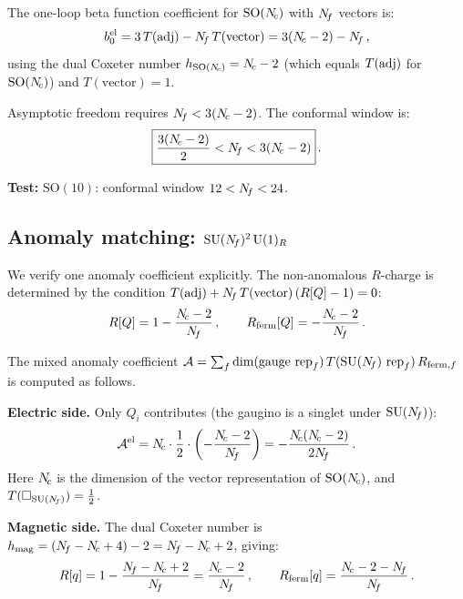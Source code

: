 \documentclass[11pt,a4paper]{article}
\newcommand{\SO}[1]{\mathrm{SO}(#1)}
\begin{document}
The one-loop beta function coefficient for $\SO{\Nc}$ with $N_{\!f}$
vectors is:
\begin{equation}\label{eq:SO-beta}
  b_0^{\text{el}} = 3\,T(\mathrm{adj}) - N_{\!f}\, T(\text{vector})
  = 3(N_{\!c} - 2) - N_{\!f}\,,
\end{equation}
using the dual Coxeter number $h_{\SO{\Nc}} = \Nc - 2$ (which equals
$T(\mathrm{adj})$ for $\SO{\Nc}$) and $T(\text{vector}) = 1$.

Asymptotic freedom requires $N_{\!f} < 3(N_{\!c} - 2)$.  The conformal
window is:
\begin{equation}\label{eq:SO-window}
  \boxed{\frac{3(N_{\!c} - 2)}{2} < N_{\!f} < 3(N_{\!c} - 2)}\,.
\end{equation}

\textbf{Test:} $\SO{10}$: conformal window $12 < N_{\!f} < 24$.\quad\checkmark

\subsection{Anomaly matching: $\mathrm{SU}(N_{\!f})^2\,\mathrm{U}(1)_R$}
\label{ssec:SO-anomaly}

We verify one anomaly coefficient explicitly.  The non-anomalous
$R$-charge is determined by the condition
$T(\mathrm{adj}) + N_{\!f}\, T(\text{vector})\,(R[Q] - 1) = 0$:
\begin{equation}\label{eq:SO-Rcharge}
  R[Q] = 1 - \frac{N_{\!c} - 2}{N_{\!f}}\,,
  \qquad
  R_{\text{ferm}}[Q] = -\frac{N_{\!c} - 2}{N_{\!f}}\,.
\end{equation}

The mixed anomaly coefficient
$\mathcal{A} = \sum_f \dim(\text{gauge rep}_f)\, T(\text{SU}(N_{\!f})
\text{ rep}_f)\, R_{\text{ferm},f}$
is computed as follows.

\textbf{Electric side.}
Only $Q_i$ contributes (the gaugino is a singlet under $\mathrm{SU}(N_{\!f})$):
\begin{equation}\label{eq:SO-Ael}
  \mathcal{A}^{\text{el}}
  = N_{\!c} \cdot \frac{1}{2} \cdot \left(-\frac{N_{\!c} - 2}{N_{\!f}}\right)
  = -\frac{N_{\!c}(N_{\!c} - 2)}{2N_{\!f}}\,.
\end{equation}
Here $N_{\!c}$ is the dimension of the vector representation of
$\SO{\Nc}$, and $T(\square_{\mathrm{SU}(N_{\!f})}) = \tfrac{1}{2}$.

\textbf{Magnetic side.}
The dual Coxeter number is $h_{\text{mag}} = (N_{\!f} - N_{\!c} + 4) - 2
= N_{\!f} - N_{\!c} + 2$, giving:
\begin{equation}\label{eq:SO-Rmag}
  R[q] = 1 - \frac{\Nf - \Nc + 2}{\Nf}
  = \frac{\Nc - 2}{\Nf}\,,
  \qquad
  R_{\text{ferm}}[q] = \frac{\Nc - 2 - \Nf}{\Nf}\,.
\end{equation}
\end{document}
